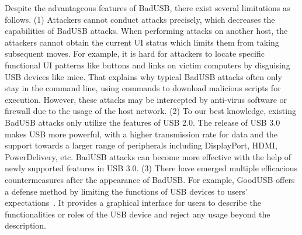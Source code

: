 Despite the advantageous features of BadUSB, there exist several limitations as
follows.  (1) Attackers cannot conduct attacks precisely, which decreases the
capabilities of BadUSB attacks.  When performing attacks on another host, the
attackers cannot obtain the current \ac{UI} status which limits
them from taking subsequent moves.  For example, it is hard for attackers to
locate specific functional \ac{UI} patterns like buttons and links on victim
computers by disguising \ac{USB} devices like mice.  That explains why typical
BadUSB attacks often only stay in the command line, using commands to download
malicious scripts for execution.  However, these attacks may be intercepted by
anti-virus software or firewall due to the usage of the host network.  (2) To
our best knowledge, existing BadUSB attacks only utilize the features of \ac{USB}
2.0.  The release of \ac{USB} 3.0 makes \ac{USB} more powerful, with a higher
transmission rate for data and the support towards a larger range of
peripherals including DisplayPort, HDMI, PowerDelivery, etc.  BadUSB attacks
can become more effective with the help of newly supported features in \ac{USB} 3.0.
(3) There have emerged multiple efficacious countermeasures after the
appearance of BadUSB.  For example, GoodUSB offers a defense method by limiting
the functions of \ac{USB} devices to users' expectations~\cite{tian2015defending}.
It provides a graphical interface for users to describe the functionalities or
roles of the \ac{USB} device and reject any usage beyond the description.

